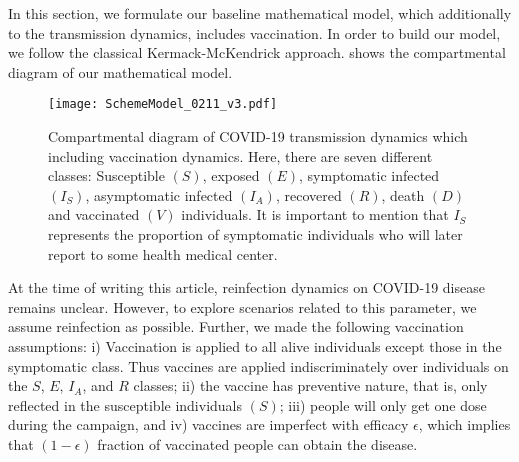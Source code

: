\label{Sec:MathematicalModelFormulation}
     In this section, we formulate our baseline
mathematical model, which additionally to
the transmission dynamics, includes
vaccination. In order to build our model, we
follow the classical Kermack-McKendrick
approach.  shows the
compartmental diagram of our mathematical
model.
\begin{figure}[h!]
    \centering
    \texttt{[image: SchemeModel\_0211\_v3.pdf]}
    \caption{
        Compartmental diagram of COVID-19 transmission dynamics
        which
        including vaccination dynamics. Here, there are seven
        different
        classes:
            Susceptible $(S)$, exposed $(E)$,
            symptomatic infected $(I_S)$,
            asymptomatic infected $(I_A)$, recovered
            $(R)$, death $(D)$ and vaccinated $(V)$
            individuals.
        It is important to mention that $I_{S}$ represents the
        proportion of
        symptomatic individuals who will later report to some
        health medical
        center.
    }
    \label{Fig:SchemeModel}
\end{figure}

    At the time of writing this article, reinfection dynamics on
    COVID-19
disease remains unclear. However, to explore scenarios related to
this
parameter, we assume reinfection as possible. Further,
we made the following vaccination assumptions:
i) Vaccination is applied to all alive individuals except those in
the
symptomatic class. Thus vaccines are applied indiscriminately over
individuals
on the $S$, $E$, $I_A$, and $R$ classes;
ii) the vaccine has preventive nature, that is, only reflected in
the
susceptible individuals $(S)$;
iii) people will only get one dose during the campaign, and
iv) vaccines are imperfect with efficacy $\epsilon$, which implies
that
$(1 - \epsilon)$ fraction of vaccinated people can obtain the
disease.

